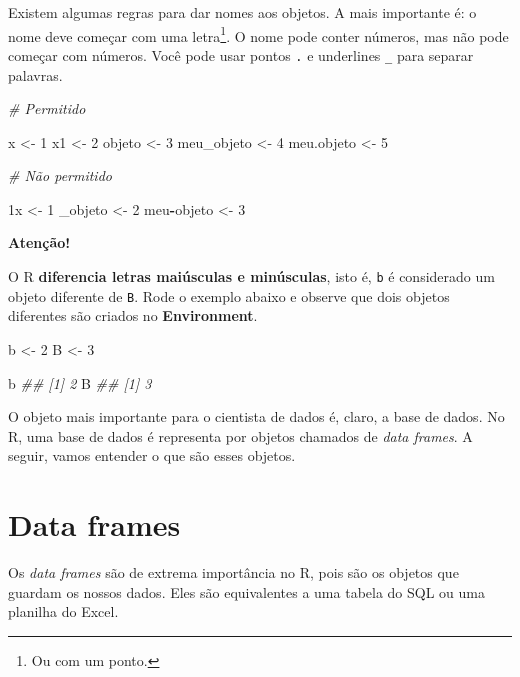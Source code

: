 \documentclass[]{book}
\newenvironment{Shaded}{\begin{snugshade}}{\end{snugshade}}
\newcommand{\CommentTok}[1]{\textcolor[rgb]{0.56,0.35,0.01}{\textit{#1}}}
\newcommand{\DecValTok}[1]{\textcolor[rgb]{0.00,0.00,0.81}{#1}}
\newcommand{\NormalTok}[1]{#1}
\newcommand{\OperatorTok}[1]{\textcolor[rgb]{0.81,0.36,0.00}{\textbf{#1}}}
\newcommand{\StringTok}[1]{\textcolor[rgb]{0.31,0.60,0.02}{#1}}
\begin{document}
Existem algumas regras para dar nomes aos objetos. A mais importante é: o nome deve começar com uma letra\footnote{Ou com um ponto.}. O nome pode conter números, mas não pode começar com números. Você pode usar pontos \texttt{.} e underlines \texttt{\_} para separar palavras.

\begin{Shaded}
\begin{Highlighting}[]
\CommentTok{# Permitido}

\NormalTok{x <-}\StringTok{ }\DecValTok{1}
\NormalTok{x1 <-}\StringTok{ }\DecValTok{2}
\NormalTok{objeto <-}\StringTok{ }\DecValTok{3}
\NormalTok{meu_objeto <-}\StringTok{ }\DecValTok{4}
\NormalTok{meu.objeto <-}\StringTok{ }\DecValTok{5}

\CommentTok{# Não permitido}

\NormalTok{1x <-}\StringTok{ }\DecValTok{1}
\NormalTok{_objeto <-}\StringTok{ }\DecValTok{2}
\NormalTok{meu}\OperatorTok{-}\NormalTok{objeto <-}\StringTok{ }\DecValTok{3}
\end{Highlighting}
\end{Shaded}

\textbf{Atenção!}

O R \textbf{diferencia letras maiúsculas e minúsculas}, isto é, \texttt{b} é considerado um objeto diferente de \texttt{B}. Rode o exemplo abaixo e observe que dois objetos diferentes são criados no \textbf{Environment}.

\begin{Shaded}
\begin{Highlighting}[]
\NormalTok{b <-}\StringTok{ }\DecValTok{2}
\NormalTok{B <-}\StringTok{ }\DecValTok{3}

\NormalTok{b}
\CommentTok{## [1] 2}
\NormalTok{B}
\CommentTok{## [1] 3}
\end{Highlighting}
\end{Shaded}

O objeto mais importante para o cientista de dados é, claro, a base de dados. No R, uma base de dados é representa por objetos chamados de \emph{data frames}. A seguir, vamos entender o que são esses objetos.

\hypertarget{data-frames}{%
\section{Data frames}\label{data-frames}}

Os \emph{data frames} são de extrema importância no R, pois são os objetos que guardam os nossos dados. Eles são equivalentes a uma tabela do SQL ou uma planilha do Excel.
\end{document}
